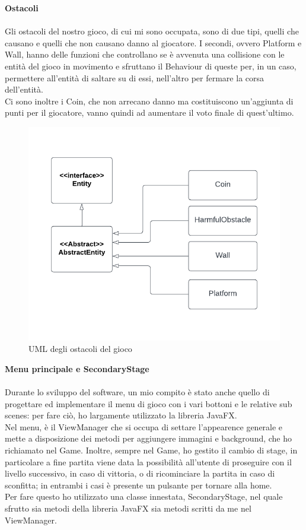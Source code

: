 \documentclass[a4paper,12pt]{report}
\begin{document}
\newpage
\textbf{Ostacoli}\\
\\
Gli ostacoli del nostro gioco, di cui mi sono occupata, sono di due tipi, quelli che causano e quelli che non causano danno al giocatore. I secondi, ovvero Platform e Wall, hanno delle funzioni che controllano se è avvenuta una collisione con le entità del gioco in movimento e sfruttano il Behaviour di queste per, in un caso, permettere all'entità di saltare su di essi, nell'altro per fermare la corsa dell'entità.\\
Ci sono inoltre i Coin, che non arrecano danno ma costituiscono un'aggiunta di punti per il giocatore, vanno quindi ad aumentare il voto finale di quest'ultimo.\\

\begin{figure}[ht]
\includegraphics[width=1\textwidth]{umlObstacles.png}
\caption{UML degli ostacoli del gioco}
\label{fig:schgen}
\end{figure}

\newpage
\textbf{Menu principale e SecondaryStage}\\
\\
Durante lo sviluppo del software, un mio compito è stato anche quello di progettare ed implementare il menu di gioco con i vari bottoni e le relative sub scenes: per fare ciò, ho largamente utilizzato la libreria JavaFX.\\
Nel menu, è il ViewManager che si occupa di settare l'appearence generale e mette a disposizione dei metodi per aggiungere immagini e background, che ho richiamato nel Game.
Inoltre, sempre nel Game, ho gestito il cambio di stage, in particolare a fine partita viene data la possibilità all'utente di proseguire con il livello successivo, in caso di vittoria, o di ricominciare la partita in caso di sconfitta; in entrambi i casi è presente un pulsante per tornare alla home.\\
Per fare questo ho utilizzato una classe innestata, SecondaryStage, nel quale sfrutto sia metodi della libreria JavaFX sia metodi scritti da me nel ViewManager.
\end{document}

